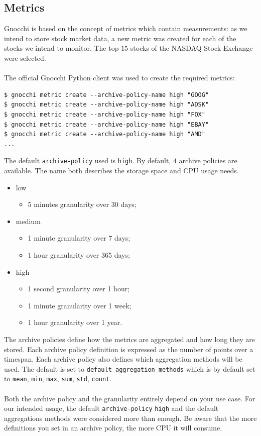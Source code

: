 \documentclass[11pt,a4paper]{article}
\begin{document}
\subsection{Metrics}
Gnocchi is based on the concept of metrics which contain measurements: as we intend to store stock market data, a new metric was created for each of the stocks we intend to monitor. The top $15$ stocks of the NASDAQ Stock Exchange were selected.\\
\\
The official Gnocchi Python client was used to create the required metrics:
\begin{lstlisting}[]
$ gnocchi metric create --archive-policy-name high "GOOG"
$ gnocchi metric create --archive-policy-name high "ADSK"
$ gnocchi metric create --archive-policy-name high "FOX"
$ gnocchi metric create --archive-policy-name high "EBAY"
$ gnocchi metric create --archive-policy-name high "AMD"
...
\end{lstlisting}
The default \texttt{archive-policy} used is \texttt{high}. By default, $4$ archive policies are available. The name both describes the storage space and CPU usage needs.
\begin{itemize}[noitemsep]
    \item low
    \begin{itemize}
        \item 5 minutes granularity over 30 days;
    \end{itemize}
    \item medium
    \begin{itemize}
        \item 1 minute granularity over 7 days;
        \item 1 hour granularity over 365 days;
    \end{itemize}
    \item high
    \begin{itemize}
        \item 1 second granularity over 1 hour;
        \item 1 minute granularity over 1 week;
        \item 1 hour granularity over 1 year.
    \end{itemize}
\end{itemize}
The archive policies define how the metrics are aggregated and how long they are stored. Each archive policy definition is expressed as the number of points over a timespan. Each archive policy also defines which aggregation methods will be used. The default is set to \texttt{default\_aggregation\_methods} which is by default set to \texttt{mean}, \texttt{min}, \texttt{max}, \texttt{sum}, \texttt{std}, \texttt{count}.\\
\\
Both the archive policy and the granularity entirely depend on your use case. For our intended usage, the default \texttt{archive-policy} \texttt{high} and the default aggregations methods were considered more than enough. Be aware that the more definitions you set in an archive policy, the more CPU it will consume.
\end{document}
